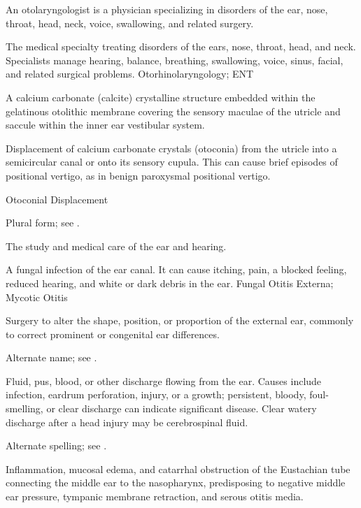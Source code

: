  An otolaryngologist is a physician specializing in disorders of the ear, nose, throat, head, neck, voice, swallowing, and related surgery.

 The medical specialty treating disorders of the ears, nose, throat, head, and neck. Specialists manage hearing, balance, breathing, swallowing, voice, sinus, facial, and related surgical problems.
\synonyms
Otorhinolaryngology; ENT


 A calcium carbonate (calcite) crystalline structure embedded within the gelatinous otolithic membrane covering the sensory maculae of the utricle and saccule within the inner ear vestibular system.

 Displacement of calcium carbonate crystals (otoconia) from the utricle into a semicircular canal or onto its sensory cupula. This can cause brief episodes of positional vertigo, as in benign paroxysmal positional vertigo.

\synonyms
Otoconial Displacement

 Plural form; see .

 The study and medical care of the ear and hearing.

 A fungal infection of the ear canal. It can cause itching, pain, a blocked feeling, reduced hearing, and white or dark debris in the ear.
\synonyms
Fungal Otitis Externa; Mycotic Otitis

 Surgery to alter the shape, position, or proportion of the external ear, commonly to correct prominent or congenital ear differences.

 Alternate name; see .

 Fluid, pus, blood, or other discharge flowing from the ear. Causes include infection, eardrum perforation, injury, or a growth; persistent, bloody, foul-smelling, or clear discharge can indicate significant disease. Clear watery discharge after a head injury may be cerebrospinal fluid.

 Alternate spelling; see .

 Inflammation, mucosal edema, and catarrhal obstruction of the Eustachian tube connecting the middle ear to the nasopharynx, predisposing to negative middle ear pressure, tympanic membrane retraction, and serous otitis media.

